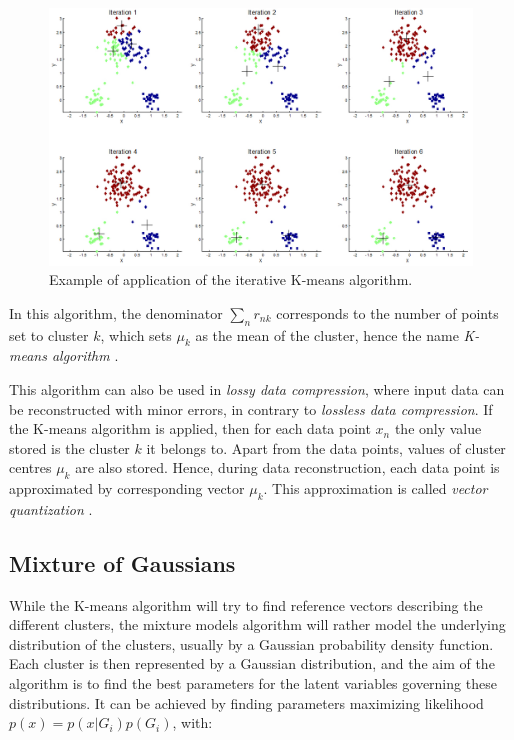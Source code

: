 \vspace{\baselineskip}

\begin{figure}[!h]
\begin{center}
\noindent \includegraphics[scale=0.45]{figures/k-mean_res} 
\newline
\caption{Example of application of the iterative K-means algorithm.}
\label{k-mean_res}
\end{center} 
\end{figure}

\noindent In this algorithm, the denominator $\sum\limits_n r_{nk}$ corresponds to the number of points set to cluster $k$, which sets $\mu_k$ as the mean of the cluster, hence the name \textit{K-means algorithm} \cite{BIS06}.
\newline

\noindent This algorithm can also be used in \textit{lossy data compression}, where input data can be reconstructed with minor errors, in contrary to \textit{lossless data compression}. If the K-means algorithm is applied, then for each data point $x_n$ the only value stored is the cluster $k$ it belongs to. Apart from the data points, values of cluster centres $\mu_k$ are also stored. Hence, during data reconstruction, each data point is approximated by corresponding vector $\mu_k$. This approximation is called \textit{vector quantization} \cite{BIS06}.
\newline

\subsection{Mixture of Gaussians}

\vspace{\baselineskip}
\noindent While the K-means algorithm will try to find reference vectors describing the different clusters, the mixture models algorithm will rather model the underlying distribution of the clusters, usually by a Gaussian probability density function. Each cluster is then represented by a Gaussian distribution, and the aim of the algorithm is to find the best parameters for the latent variables governing these distributions. It can be achieved by finding parameters maximizing likelihood $p(x)=p(x|G_i)p(G_i)$, with:

